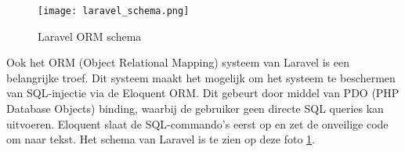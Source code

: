\begin{figure}
    \centering
    \texttt{[image: laravel\_schema.png]}
    \caption[Laravel ORM schema]{Laravel ORM schema ~\autocite{2020}}
    \label{fig:laravel_schema}
\end{figure}

Ook het ORM (Object Relational Mapping) systeem van Laravel is een belangrijke troef. Dit systeem maakt het mogelijk om 
het systeem te beschermen van SQL-injectie via de Eloquent ORM. Dit gebeurt door middel van PDO (PHP Database Objects) binding, waarbij de
gebruiker geen directe SQL queries kan uitvoeren. Eloquent slaat de SQL-commando's eerst op en zet de onveilige code om 
naar tekst. Het schema van Laravel is te zien op deze foto \ref{fig:laravel_schema}.
